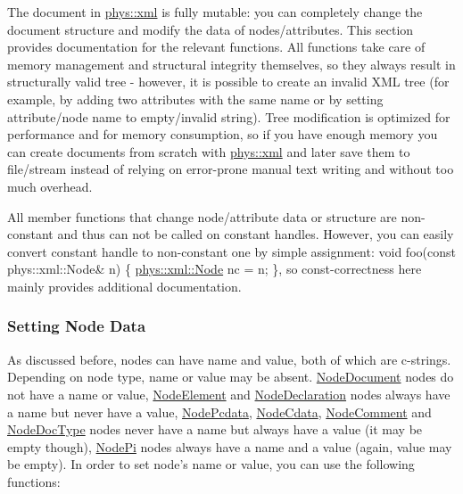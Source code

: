 The document in \hyperlink{namespacephys_1_1xml}{phys::xml} is fully mutable: you can completely change the document structure and modify the data of nodes/attributes. This section provides documentation for the relevant functions. All functions take care of memory management and structural integrity themselves, so they always result in structurally valid tree -\/ however, it is possible to create an invalid XML tree (for example, by adding two attributes with the same name or by setting attribute/node name to empty/invalid string). Tree modification is optimized for performance and for memory consumption, so if you have enough memory you can create documents from scratch with \hyperlink{namespacephys_1_1xml}{phys::xml} and later save them to file/stream instead of relying on error-\/prone manual text writing and without too much overhead. \par
 \par
 All member functions that change node/attribute data or structure are non-\/constant and thus can not be called on constant handles. However, you can easily convert constant handle to non-\/constant one by simple assignment: void foo(const phys::xml::Node\& n) \{ \hyperlink{classphys_1_1xml_1_1Node}{phys::xml::Node} nc = n; \}, so const-\/correctness here mainly provides additional documentation. \par
 \par
 \hypertarget{XMLManual_XMLModifyingNodeData}{}\subsubsection{Setting Node Data}\label{XMLManual_XMLModifyingNodeData}
As discussed before, nodes can have name and value, both of which are c-\/strings. Depending on node type, name or value may be absent. \hyperlink{namespacephys_1_1xml_a668b0cc666a9d49f7c7222a7552115d3}{NodeDocument} nodes do not have a name or value, \hyperlink{namespacephys_1_1xml_a668b0cc666a9d49f7c7222a7552115d3}{NodeElement} and \hyperlink{namespacephys_1_1xml_a668b0cc666a9d49f7c7222a7552115d3}{NodeDeclaration} nodes always have a name but never have a value, \hyperlink{namespacephys_1_1xml_a668b0cc666a9d49f7c7222a7552115d3}{NodePcdata}, \hyperlink{namespacephys_1_1xml_a668b0cc666a9d49f7c7222a7552115d3}{NodeCdata}, \hyperlink{namespacephys_1_1xml_a668b0cc666a9d49f7c7222a7552115d3}{NodeComment} and \hyperlink{namespacephys_1_1xml_a668b0cc666a9d49f7c7222a7552115d3}{NodeDocType} nodes never have a name but always have a value (it may be empty though), \hyperlink{namespacephys_1_1xml_a668b0cc666a9d49f7c7222a7552115d3}{NodePi} nodes always have a name and a value (again, value may be empty). In order to set node's name or value, you can use the following functions: 
